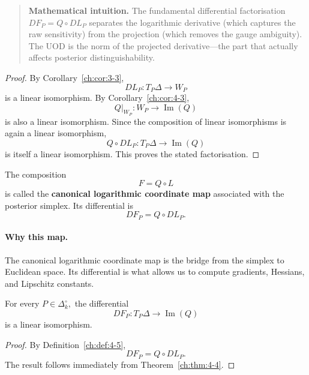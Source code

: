 \begin{quote}
\textbf{Mathematical intuition.}
The fundamental differential factorisation $DF_P = Q\circ DL_P$ separates the logarithmic derivative (which captures the raw sensitivity) from the projection (which removes the gauge ambiguity).
The UOD is the norm of the projected derivative---the part that actually affects posterior distinguishability.
\end{quote}
\begin{proof}
By Corollary~\ref{ch:cor:3-3},
\[
DL_P
:
T_P\Delta
\longrightarrow
W_P
\]
is a linear isomorphism.
By Corollary~\ref{ch:cor:4-3},
\[
Q|_{W_P}
:
W_P
\longrightarrow
\operatorname{Im}(Q)
\]
is also a linear isomorphism.
Since the composition of linear isomorphisms is again a linear isomorphism,
\[
Q\circ DL_P
:
T_P\Delta
\longrightarrow
\operatorname{Im}(Q)
\]
is itself a linear isomorphism.
This proves the stated factorisation. 
\end{proof}
\begin{definition}
\label{ch:def:4-5}
The composition
\[
F
=
Q\circ L
\]
is called the \textbf{canonical logarithmic coordinate map} associated with the posterior simplex.
Its differential is
\[
DF_P
=
Q\circ DL_P.
\]
\end{definition}

\paragraph{Why this map.}
The canonical logarithmic coordinate map is the bridge from the simplex to Euclidean space.  Its differential is what allows us to compute gradients, Hessians, and Lipschitz constants.

\begin{corollary}
\label{ch:cor:4-6}
For every
$P\in\Delta_k^\circ,$
the differential
\[
DF_P
:
T_P\Delta
\longrightarrow
\operatorname{Im}(Q)
\]
is a linear isomorphism.
\end{corollary}
\begin{proof}
By Definition~\ref{ch:def:4-5},
\[
DF_P
=
Q\circ DL_P.
\]
The result follows immediately from Theorem~\ref{ch:thm:4-4}. 
\end{proof}
